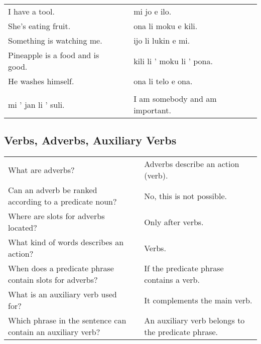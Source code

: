 \begin{supertabular}{p{5,5cm}|ll}
I have a tool. && mi jo e ilo. \\ %
She's eating fruit. && ona li moku e kili. \\ %
Something is watching me. && ijo li lukin e mi. \\ %
Pineapple is a food and is good. && kili li ' moku li ' pona. \\ %
He washes himself. && ona li telo e ona.  \\ %
 && \\ %
mi ' jan li ' suli. && I am somebody and am important. \\
\end{supertabular} 

\subsection*{Verbs, Adverbs, Auxiliary Verbs} 
\label{'adverbs'}
%
\begin{supertabular}{p{5,5cm}|ll}
What are adverbs? && Adverbs describe an action (verb). \\ %
Can an adverb be ranked according to a predicate noun? && No, this is not possible.  \\ %
Where are slots for adverbs located? && Only after verbs. \\ %
What kind of words describes an action? && Verbs. \\ %
When does a predicate phrase contain slots for adverbs? && If the predicate phrase contains a verb. \\ %
What is an auxiliary verb used for?  && It complements the main verb.  \\ %
Which phrase in the sentence can contain an auxiliary verb? && An auxiliary verb belongs to the predicate phrase.  \\ %
\end{supertabular} 


